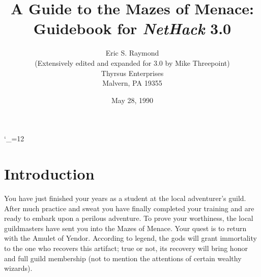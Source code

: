 
\textheight 215mm
\textwidth 160mm
\oddsidemargin 0mm
\evensidemargin 0mm
\topmargin 0mm

\newcommand{\nd}{\noindent}

\newcommand{\tb}[1]{\tt #1 \hfill}
\newcommand{\bb}[1]{\bf #1 \hfill}
\newcommand{\ib}[1]{\it #1 \hfill}

\newcommand{\blist}[1]
{\begin{list}{$\bullet$}
    {\leftmargin 30mm \topsep 2mm \partopsep 0mm \parsep 0mm \itemsep 1mm
     \labelwidth 28mm \labelsep 2mm
     #1}}

\newcommand{\elist}{\end{list}}

\catcode`\_=12


%
%

\title{\LARGE A Guide to the Mazes of Menace:\\
\Large Guidebook for {\it NetHack\/} 3.0}

\author{Eric S. Raymond\\
(Extensively edited and expanded for 3.0 by Mike Threepoint)\\
Thyrsus Enterprises\\
Malvern, PA 19355
}
\date{May 28, 1990}

\maketitle

\section{Introduction}

You have just finished your years as a student at the local adventurer's
guild.  After much practice and sweat you have finally completed your
training and are ready to embark upon a perilous adventure.  To prove
your worthiness, the local guildmasters have sent you into the Mazes of
Menace.  Your quest is to return with the Amulet of Yendor.  According
to legend, the gods will grant immortality to the one who recovers this
artifact; true or not, its recovery will bring honor and full guild
membership (not to mention the attentions of certain wealthy wizards).

